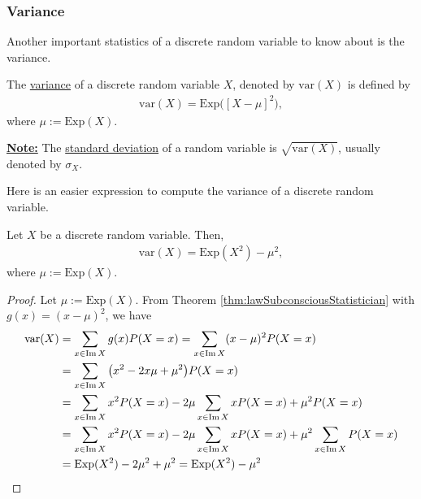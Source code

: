 \subsubsection*{Variance}

Another important statistics of a discrete random variable to know about is the variance.

\begin{definition}
The \underline{variance} of a discrete random variable $X$, denoted by $\mathrm{var} (X)$ is defined by
    \begin{align*}
    \mathrm{var} (X) = \mathrm{Exp} \big( [X - \mu ]^2 \big) ,
    \end{align*} 
where $\mu := \mathrm{Exp} (X)$.
\end{definition}

\underline{\textbf{Note:}} The \underline{standard deviation} of a random variable is $\sqrt{\mathrm{var} (X)}$, usually denoted by $\sigma_X$. 

Here is an easier expression to compute the variance of a discrete random variable.

\begin{theorem}\label{Thm:FormulatVariance}
Let $X$ be a discrete random variable. Then,
    \begin{align*}
    \mathrm{var} (X) = \mathrm{Exp} (X^2) - \mu^2 ,
    \end{align*} 
where $\mu := \mathrm{Exp} (X)$.
\end{theorem}
\begin{proof}
Let $\mu := \mathrm{Exp} (X)$. From Theorem \ref{thm:lawSubconsciousStatistician} with $g(x) = (x - \mu)^2$, we have
    \begin{align*}
    \mathrm{var} (X) &= \sum_{x \in \operatorname{Im} X} g (x) P (X = x) = \sum_{x \in \operatorname{Im} X} (x - \mu)^2 P (X = x) \\
    &= \sum_{x \in \operatorname{Im} X} \big( x^2 - 2 x \mu + \mu^2 \big) P (X = x) \\
    &= \sum_{x \in \operatorname{Im} X} x^2 P (X = x) - 2 \mu \sum_{x \in \operatorname{Im} X} x P (X = x) + \mu^2 P (X = x) \\
    &= \sum_{x \in \operatorname{Im} X} x^2 P (X = x) - 2 \mu \sum_{x \in \operatorname{Im} X} x P (X = x) + \mu^2 \sum_{x \in \operatorname{Im} X} P (X = x) \\
    &= \mathrm{Exp} (X^2) - 2 \mu^2 + \mu^2 = \mathrm{Exp} (X^2) - \mu^2 \qedhere
    \end{align*} 
\end{proof}

